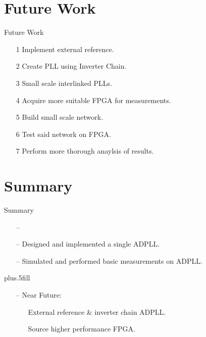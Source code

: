 \documentclass{beamer}
\begin{document}
\section*{Future Work}

\begin{frame}{Future Work}
    \begin{itemize}
        \item[1]
            Implement external reference. %
        \item[2]
            Create PLL using Inverter Chain. %
        \item[3]
            Small scale interlinked PLLs. %
        \item[4]
            Acquire more suitable FPGA for measurements. %
        \item[5]
            Build small scale network. %
        \item[6]
            Test said network on FPGA. %
        \item[7]
            Perform more thorough anaylsis of results. %
    \end{itemize}
 
\end{frame}

\section*{Summary}

\begin{frame}{Summary}

    \begin{itemize}
        \item[--]
        \item[--]
            Designed and implemented a single ADPLL.
        \item[--]
            Simulated and performed basic measurements on ADPLL.
    \end{itemize}

    \vskip0pt plus.5fill
    \begin{itemize}
        \item[--]
        Near Future:
        \begin{itemize}
            \item[]
                External reference \& inverter chain ADPLL.
            \item[]
                Source higher performance FPGA.
    \end{itemize}
  \end{itemize}
\end{frame}
\end{document}
